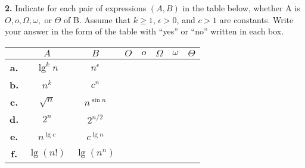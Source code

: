 \documentclass[addpoints]{exam}
\begin{document}
\begin{questions}
\begin{solution}




  \end{solution}

  \question
  \textbf{2. } Indicate for each pair of expressions $(A, B)$ in the table below, whether A is $ O, o, \Omega, \omega,  $ or $ \Theta $ of B. Assume that $ k \geq 1 $, $ \epsilon > 0 $, and $ c > 1 $ are constants. Write your answer in the form of the table with ``yes'' or ``no'' written in each box.

  \begin{table}[H]
    \centering
    \begin{tabular}{c | c c | c | c | c | c | c |}
                  & $A$           & $B$            & $O$ & $o$ & $\Omega$ & $\omega$ & $ \Theta $ \\ \hline
      \textbf{a.} & $ \lg^k n $   & $ n^\epsilon $ &     &     &          &          &            \\ \hline
      \textbf{b.} & $ n^k $       & $ c^n $        &     &     &          &          &            \\ \hline
      \textbf{c.} & $ \sqrt{n} $  & $ n^{\sin n} $ &     &     &          &          &            \\ \hline
      \textbf{d.} & $ 2^n $       & $ 2^{n/2} $    &     &     &          &          &            \\ \hline
      \textbf{e.} & $ n^{\lg c} $ & $ c^{\lg n} $  &     &     &          &          &            \\ \hline
      \textbf{f.} & $ \lg(n!) $   & $ \lg(n^n) $   &     &     &          &          &            \\ \hline
    \end{tabular}
  \end{table}


\end{questions}
\end{document}
